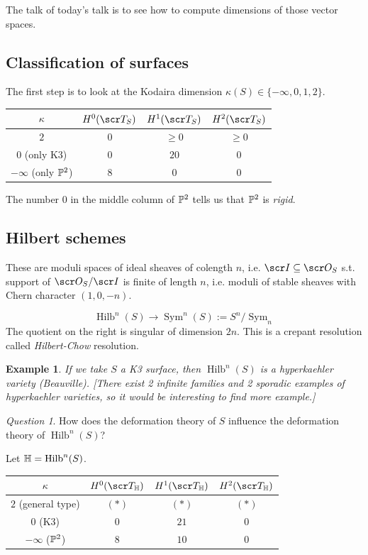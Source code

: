 \documentclass[A4paper, british, reqno]{amsart}
\theoremstyle{darkgreentheorem}
\theoremstyle{darkbluedefinition}
\theoremstyle{darkredexample}
\newtheorem{exa}[thm]{Example}
\theoremstyle{remark}
\newtheorem{q}[thm]{Question}
\DeclareMathOperator{\Sym}{Sym}
\DeclareMathOperator{\Hilb}{Hilb}
\newcommand{\1}{\mathbbm{1}}
\newcommand{\sub}{\subseteq}
\begin{document}
The talk of today's talk is to see how to compute dimensions of those vector spaces.

\subsection{Classification of surfaces}

The first step is to look at the Kodaira dimension $\kappa(S)\in \{-\infty,0,1,2\}$.
\begin{center}
    \begin{tabular}{|c|c|c|c|}
	\hline
	$\kappa$ & $H^{0}(\sT_{S})$ & $H^{1}(\sT_{S})$ & $H^{2}(\sT_{S})$ \\
	\hline
	$2$ & $0$ & $\geqslant 0$ & $\geqslant 0$ \\
	$0$ (only K3) & $0$ & $20$ & $0$ \\
	$-\infty$ (only $\P^{2}$) & $8$ & $0$ & $0$ \\
	\hline
    \end{tabular}
\end{center}

The number $0$ in the middle column of $\P^{2}$ tells us that $\P^{2}$ is \textit{rigid}.

\subsection{Hilbert schemes}

These are moduli spaces of ideal sheaves of colength $n$, i.e. $\I\sub \O_{S}$ s.t. support of $\O_{S}/\I$ is finite of length $n$, i.e. moduli of stable sheaves with Chern character $(1,0,-n)$.

\[ \Hilb^{n}(S)\to \Sym^{n}(S):=S^{n}/\Sym_{n} \]
The quotient on the right is singular of dimension $2n$.
This is a crepant resolution called \textit{Hilbert-Chow} resolution.

\begin{exa}
    If we take $S$ a K3 surface, then $\Hilb^{n}(S)$ is a hyperkaehler variety (Beauville).
    [There exist 2 infinite families and 2 sporadic examples of hyperkaehler varieties, so it would be interesting to find more example.]
\end{exa}

\begin{q}
    How does the deformation theory of $S$ influence the deformation theory of $\Hilb^{n}(S)$?
\end{q}

Let $\bbH=\Hilb^{n}(S)$.
\begin{center}
    \begin{tabular}{|c|c|c|c|}
	\hline
	$\kappa$ & $H^{0}(\sT_{\bbH})$ & $H^{1}(\sT_{\bbH})$ & $H^{2}(\sT_{\bbH})$ \\
	\hline
	$2$ (general type) & $(*)$ & $(*)$ & $(*)$ \\
	$0$ (K3) & $0$ & $21$ & $0$ \\
	$-\infty$ ($\P^{2}$) & $8$ & $10$ & $0$ \\
	\hline
    \end{tabular}
\end{center}
\end{document}
